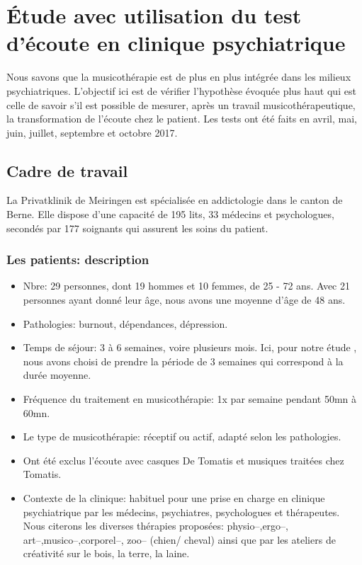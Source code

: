 \chapter[\'Etude en clinique]{\'Etude avec utilisation du test
  d'écoute en clinique psychiatrique}

Nous savons que la musicothérapie est de plus en plus intégrée dans
les milieux psychiatriques.
L'objectif ici est de vérifier l'hypothèse évoquée plus haut qui est celle de
savoir s'il est possible de mesurer, après un travail 
musicothérapeutique, la transformation de l'écoute chez le
patient.
Les tests ont été faits en avril, mai, juin, juillet, septembre et octobre 2017.

\section{Cadre de travail}

 La Privatklinik
de Meiringen est  spécialisée en
addictologie dans le canton de Berne. Elle dispose d'une capacité de 195 lits, 33 médecins et
psychologues, secondés par 177 soignants qui assurent les soins du
patient.




\subsection{Les patients: description}


 \begin{itemize}
 
 \item Nbre: 29 personnes, dont 19 hommes et 10 femmes, de 25 - 72
   ans. Avec 21 personnes ayant  donné leur âge, nous avons une
   moyenne d'âge de 48 ans. 

   
 

 \item Pathologies:  burnout, dépendances, dépression.

 \item Temps de séjour: 3 à 6 semaines, voire plusieurs mois. Ici, pour
notre étude , nous avons choisi de prendre la période de 3 semaines
qui correspond à la durée moyenne.
 \item Fréquence du traitement en musicothérapie: 1x par semaine pendant
50mn à 60mn.
 \item Le type de musicothérapie: réceptif ou actif, adapté selon les pathologies.
 \item Ont été  exclus l'écoute avec casques De Tomatis et  musiques traitées
   chez Tomatis.
 \item Contexte de la clinique: habituel pour une prise en
charge en clinique psychiatrique 
par les médecins, psychiatres, psychologues et thérapeutes.
Nous citerons les diverses thérapies proposées: physio--,ergo--,
art--,musico--,corporel--, zoo--  (chien/ cheval)  ainsi
que par les  ateliers de créativité sur le bois, la terre, la laine.  

\end{itemize}
